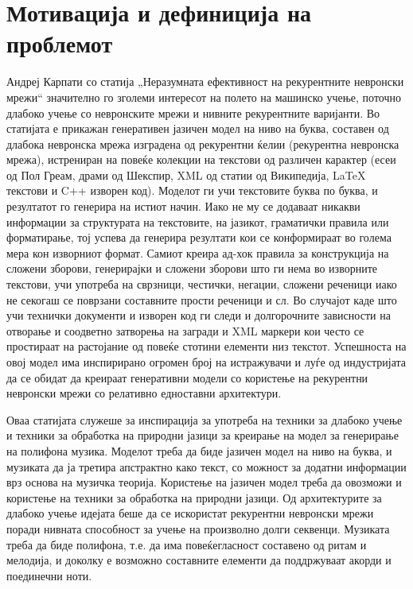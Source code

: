 \chapter{Мотивација и дефиниција на проблемот}
\label{ch:motivacija}

Андреј Карпати со статија „Неразумната ефективност на рекурентните невронски мрежи“ \cite{AndrejKarpathy2015} значително го зголеми интересот на полето на машинско учење, поточно длабоко учење со невронските мрежи и нивните рекурентните варијанти. Во статијата е прикажан генеративен јазичен модел на ниво на буква, составен од длабока невронска мрежа изградена од рекурентни ќелии (рекурентна невронска мрежа), истрениран на повеќе колекции на текстови од различен карактер (есеи од Пол Греам, драми од Шекспир, XML од статии од Википедија, LaTeX текстови и C++ изворен код). Моделот ги учи текстовите буква по буква, и резултатот го генерира на истиот начин. Иако не му се додаваат никакви информации за структурата на текстовите, на јазикот, граматички правила или форматирање, тој успева да генерира резултати кои се конформираат во голема мера кон изворниот формат. Самиот креира ад-хок правила за конструкција на сложени зборови, генерирајки и сложени зборови што ги нема во изворните текстови, учи употреба на сврзници, честички, негации, сложени реченици иако не секогаш се поврзани составните прости реченици и сл. Во случајот каде што учи технички документи и изворен код ги следи и долгорочните зависности на отворање и соодветно затворења на загради и XML маркери кои често се простираат на растојание од повеќе стотини елементи низ текстот. Успешноста на овој модел има инспирирано огромен број на истражувачи и луѓе од индустријата да се обидат да креираат генеративни модели со користење на рекурентни невронски мрежи со релативно едноставни архитектури. 

Оваа статијата служеше за инспирација за употреба на техники за длабоко учење и техники за обработка на природни јазици за креирање на модел за генерирање на полифона музика. Моделот треба да биде јазичен модел на ниво на буква, и музиката да ја третира апстрактно како текст, со можност за додатни информации врз основа на музичка теорија. Користење на јазичен модел треба да овозможи и користење на техники за обработка на природни јазици. Од архитектурите за длабоко учење идејата беше да се искористат рекурентни невронски мрежи поради нивната способност за учење на произволно долги секвенци. Музиката треба да биде полифона, т.е. да има повеќегласност составено од ритам и мелодија, и доколку е возможно составните елементи да поддржуваат акорди и поединечни ноти.

